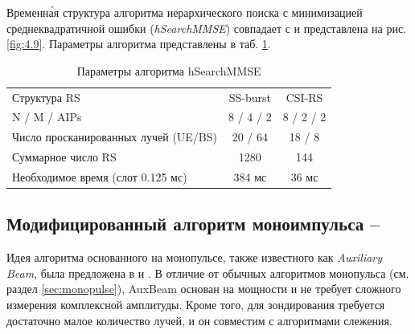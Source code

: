 Временн\'{а}я структура алгоритма иерархического поиска с минимизацией
среднеквадратичной ошибки (\textit{hSearchMMSE}) совпадает с \baseline и представлена на рис. \ref{fig:4.9}.
Параметры алгоритма представлены в таб. \ref{tab:4.3}.
\begin{table}
    \centering
    \caption{Параметры алгоритма hSearchMMSE}
    \label{tab:4.3}
    \begin{tabular}{lcc}
        \toprule
        \midrule
        Структура RS                                  & SS-burst  & CSI-RS    \\
        N / M / AIPs                                  & 8 / 4 / 2 & 8 / 2 / 2 \\
        Число просканированных \newline лучей (UE/BS) & 20 / 64   & 18 / 8    \\
        Суммарное число RS                            & 1280      & 144       \\
        Необходимое время (слот 0.125 мс)             & 384 мс    & 36 мс     \\
        \bottomrule
    \end{tabular}
\end{table}

\subsection[Модифицированный алгоритм моноимпульса]{Модифицированный алгоритм моноимпульса -- \AuxBeam}
\label{sec:AuxBeam:singlepath}
Идея алгоритма основанного на монопульсе, также известного как \textit{Auxiliary Beam}, была
предложена в \cite{Zhu2016} и \cite{Kim2019}. В отличие от обычных алгоритмов
монопульса (см. раздел \ref{sec:monopulse}), AuxBeam основан на мощности и не
требует сложного измерения комплексной амплитуды. Кроме того, для зондирования требуется
достаточно малое количество лучей, и он совместим с алгоритмами слежения.

